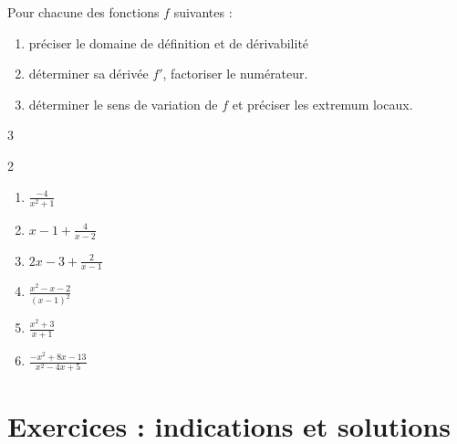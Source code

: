 \documentclass[main.tex]{subfiles}
\begin{document}
\begin{exercise} \label{chapter06:exercice:derivation:operation10}
	Pour chacune des fonctions $f$ suivantes :
	\begin{enumerate}[leftmargin=*,label={\textbullet}]
		\item préciser le domaine de définition et de dérivabilité
		\item déterminer sa dérivée $f'$, factoriser le numérateur.
		\item déterminer le sens de variation de $f$ et préciser les extremum locaux.
	\end{enumerate} 
	\vspace{-1em}
	\begin{multicols}{3}
		\begin{spacing}{2} 
			\begin{enumerate}[label={\arabic*)$f(x)=$}, leftmargin=*]
				\item $\frac{-4}{x^2+1}$ 
				\item $x-1+\frac{4}{x-2}$
				\item $2x-3+\frac{2}{x-1}$
				\item $\frac{x^2-x-2}{(x-1)^2}$ 
				\item $\frac{x^2+3}{x+1}$ 
				\item $\frac{-x^2+8x-13}{x^2-4x+5}$   
			\end{enumerate} 
		\end{spacing}
	\end{multicols}  
\end{exercise}





%	 
\newpage 
{}  
\pagestyle{scrheadings} %
\onehalfspacing

\section{Exercices : indications et solutions} 
   
\end{document}
